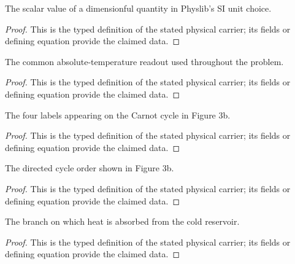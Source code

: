 \begin{definition}
  \label{def:physics:IPhO_2026_3_C_5:aux007}
  The scalar value of a dimensionful quantity in Physlib's SI unit choice.
\end{definition}
\begin{proof}
  This is the typed definition of the stated physical carrier; its fields or defining equation provide the claimed data.
\end{proof}

\begin{definition}
  \label{def:physics:IPhO_2026_3_C_5:aux008}
  The common absolute-temperature readout used throughout the problem.
\end{definition}
\begin{proof}
  This is the typed definition of the stated physical carrier; its fields or defining equation provide the claimed data.
\end{proof}

\begin{definition}
  \label{def:physics:IPhO_2026_3_C_5:aux009}
  The four labels appearing on the Carnot cycle in Figure 3b.
\end{definition}
\begin{proof}
  This is the typed definition of the stated physical carrier; its fields or defining equation provide the claimed data.
\end{proof}

\begin{definition}
  \label{def:physics:IPhO_2026_3_C_5:aux010}
  The directed cycle order shown in Figure 3b.
\end{definition}
\begin{proof}
  This is the typed definition of the stated physical carrier; its fields or defining equation provide the claimed data.
\end{proof}

\begin{definition}
  \label{def:physics:IPhO_2026_3_C_5:aux011}
  The branch on which heat is absorbed from the cold reservoir.
\end{definition}
\begin{proof}
  This is the typed definition of the stated physical carrier; its fields or defining equation provide the claimed data.
\end{proof}

